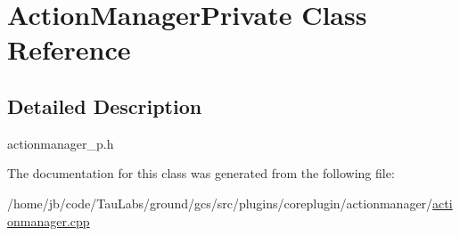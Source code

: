 \hypertarget{class_action_manager_private}{\section{\-Action\-Manager\-Private \-Class \-Reference}
\label{class_action_manager_private}
}


\subsection{\-Detailed \-Description}
actionmanager\-\_\-p.\-h 

\-The documentation for this class was generated from the following file\-:\begin{DoxyCompactItemize}
\item 
/home/jb/code/\-Tau\-Labs/ground/gcs/src/plugins/coreplugin/actionmanager/\hyperlink{actionmanager_8cpp}{actionmanager.\-cpp}\end{DoxyCompactItemize}
